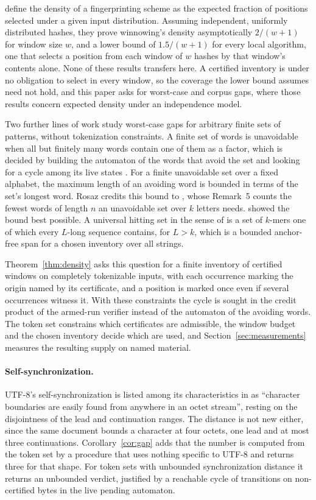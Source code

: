\documentclass[11pt,a4paper]{article}
\theoremstyle{definition}
\theoremstyle{plain}
\begin{document}
\citet{schleimer2003winnowing} define the density of a fingerprinting scheme as the expected fraction of positions
selected under a given input distribution. Assuming independent, uniformly distributed hashes, they prove winnowing's
density asymptotically $2/(w+1)$ for window size $w$, and a lower bound of $1.5/(w+1)$ for every local algorithm, one
that selects a position from each window of $w$ hashes by that window's contents alone. None of these results transfers
here. A certified inventory is under no obligation to select in every window, so the coverage the lower bound assumes
need not hold, and this paper asks for worst-case and corpus gaps, where those results concern expected density under an
independence model.

Two further lines of work study worst-case gaps for arbitrary finite sets of patterns, without tokenization constraints.
A finite set of words is unavoidable when all but finitely many words contain one of them as a factor, which is decided
by building the automaton of the words that avoid the set and looking for a cycle among its live states
\citep{rosaz1995unavoidable}. For a finite unavoidable set over a fixed alphabet, the maximum length of an avoiding word
is bounded in terms of the set's longest word. Rosaz credits this bound to \citet{schutzenberger1964synchronizing},
whose Remark~5 counts the fewest words of length $n$ an unavoidable set over $k$ letters needs.
\citet{crochemore1983unavoidable} showed the bound best possible. A universal hitting set in the sense of
\citet{orenstein2017hitting} is a set of $k$-mers one of which every $L$-long sequence contains, for $L > k$, which is a
bounded anchor-free span for a chosen inventory over all strings.

Theorem~\ref{thm:density} asks this question for a finite inventory of certified windows on completely tokenizable
inputs, with each occurrence marking the origin named by its certificate, and a position is marked once even if several
occurrences witness it. With these constraints the cycle is sought in the credit product of the armed-run verifier
instead of the automaton of the avoiding words. The token set constrains which certificates are admissible, the window
budget and the chosen inventory decide which are used, and Section~\ref{sec:measurements} measures the resulting supply
on named material.

\paragraph{Self-synchronization.} UTF-8's self-synchronization is listed among its characteristics in
\citet{yergeau2003utf8} as ``character boundaries are easily found from anywhere in an octet stream'', resting on the
disjointness of the lead and continuation ranges. The distance is not new either, since the same document bounds a
character at four octets, one lead and at most three continuations. Corollary~\ref{cor:gap} adds that the number is
computed from the token set by a procedure that uses nothing specific to UTF-8 and returns three for that shape. For
token sets with unbounded synchronization distance it returns an unbounded verdict, justified by a reachable cycle of
transitions on non-certified bytes in the live pending automaton.
\end{document}
